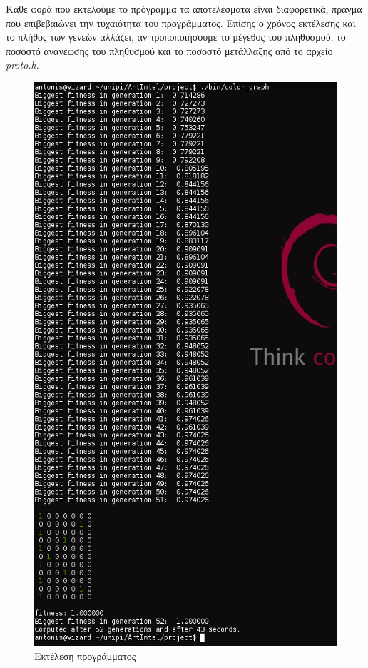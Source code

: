 \documentclass{article}
\begin{document}
Κάθε φορά που εκτελούμε το πρόγραμμα τα αποτελέσματα είναι διαφορετικά, πράγμα
που επιβεβαιώνει την τυχαιότητα του προγράμματος. Επίσης ο χρόνος εκτέλεσης και
το πλήθος των γενεών αλλάζει, αν τροποποιήσουμε το μέγεθος του πληθυσμού, το
ποσοστό ανανέωσης του πληθυσμού και το ποσοστό μετάλλαξης από το αρχείο
\emph{proto.h}.
\begin{figure}[tbh]
\centering
\includegraphics[scale=0.8]{running.png}
\caption{Εκτέλεση προγράμματος}
\label{running}
\end{figure}
\end{document}
